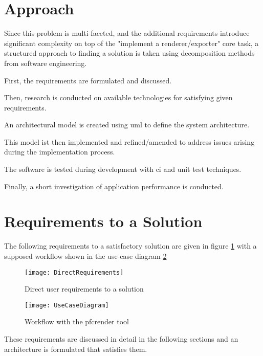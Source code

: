 \section{Approach}

Since this problem is multi-faceted, and the additional requirements introduce significant complexity on top of the "implement a renderer/exporter" core task, a structured approach to finding a solution is taken using decomposition methods from software engineering.

First, the requirements are formulated and discussed.

Then, research is conducted on available technologies for satisfying given requirements.

An architectural model is created using \gls{uml} to define the system architecture.

This model ist then implemented and refined/amended to address issues arising during the implementation process.

The software is tested during development with \gls{ci} and \gls{unit test} techniques.

Finally, a short investigation of application performance is conducted.

\section{Requirements to a Solution}
The following requirements to a satisfactory solution are given in figure \ref{fig:directreq} with a supposed workflow shown in the use-case diagram \ref{fig:uc}

\begin{figure}[h]
	\texttt{[image: DirectRequirements]}
	\caption{Direct user requirements to a solution}
	\label{fig:directreq}
\end{figure}


\begin{figure}
	\texttt{[image: UseCaseDiagram]}
	\caption{Workflow with the pfcrender tool}
	\label{fig:uc}
\end{figure}

These requirements are discussed in detail in the following sections and an architecture is formulated that satisfies them.
